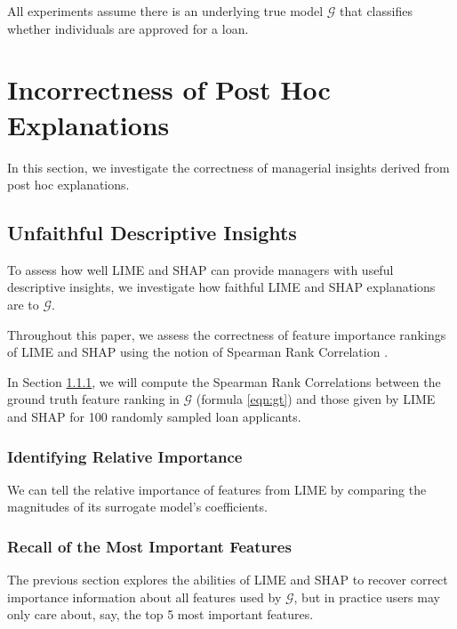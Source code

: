 \documentclass[12pt]{article}    %
\begin{document}
All experiments assume there is an underlying true model $\mathcal{G}$ that classifies whether individuals are approved for a loan. 



\section{Incorrectness of Post Hoc Explanations}
    In this section, we investigate the correctness of managerial insights derived from post hoc explanations. 


            \subsection{Unfaithful Descriptive Insights}
                    \label{sec:unfaithful_descriptive}
To assess how well LIME and SHAP can provide managers with useful descriptive insights, we investigate how faithful LIME and SHAP explanations are to $\mathcal{G}$. 

                     
Throughout this paper, we assess the correctness of feature importance rankings of LIME and SHAP using the notion of Spearman Rank Correlation \citep{MyersJeromeL2010Rdas}.
                     
 In Section \ref{sec:relative_importance}, we will compute the Spearman Rank Correlations between the ground truth feature ranking in $\mathcal{G}$ (formula \ref{eqn:gt}) and those given by LIME and SHAP for 100 randomly sampled loan applicants.



                    \subsubsection{Identifying Relative Importance}
                        \label{sec:relative_importance}
                        We can tell the relative importance of features from LIME by comparing the magnitudes of its surrogate model's coefficients. 


                    \subsubsection{Recall of the Most Important Features}
                        The previous section explores the abilities of LIME and SHAP to recover correct importance information about all features used by $\mathcal{G}$, but in practice  users may only care about, say, the top 5 most important features. 
\end{document}
